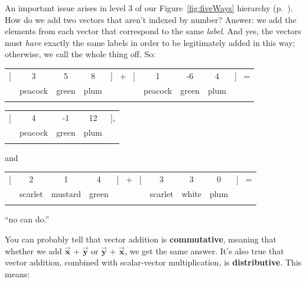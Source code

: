 An important issue arises in level 3 of our Figure~\ref{fig:fiveWays} hierarchy
(p.~\pageref{fig:fiveWays}). How do we add two vectors that aren't indexed by
number? Answer: we add the elements from each vector that correspond to the
same \textit{label}. And yes, the vectors must \textit{have} exactly the same
labels in order to be legitimately added in this way; otherwise, we call the
whole thing off. So:


\begin{center}
\begin{tabular}{ccccccccc}
[ & 3 & 5 & 8 & ] \ + \ [ & 1 & -6 & 4 & ] \ = \\
& \scriptsize{peacock} & \scriptsize{green} & \scriptsize{plum} & &
\scriptsize{peacock} & \scriptsize{green} & \scriptsize{plum} & \\
\normalsize
\end{tabular}
\vspace{-.15in}
\begin{tabular}{ccccc}
[ & 4 & -1 & 12 & ], \\
& \scriptsize{peacock} & \scriptsize{green} & \scriptsize{plum} & \\
\normalsize
\end{tabular}
\end{center}
\vspace{-.15in}

and


\begin{center}
\begin{tabular}{ccccccccc}
[ & 2 & 1 & 4 & ] \ + \ [ & 3 & 3 & 0 & ] \ = \\
& \scriptsize{scarlet} & \scriptsize{mustard} & \scriptsize{green} & &
\scriptsize{scarlet} & \scriptsize{white} & \scriptsize{plum} & \\
\normalsize
\end{tabular}

\vspace{-.15in}
``no can do.''
\end{center}
\vspace{-.15in}


\medskip
You can probably tell that vector addition is \textbf{commutative}, meaning
that whether we add $\overrightarrow{\textbf{x}}$ +
$\overrightarrow{\textbf{y}}$ or $\overrightarrow{\textbf{y}}$ +
$\overrightarrow{\textbf{x}}$, we get the same answer. It's also true that
vector addition, combined with scalar-vector multiplication, is
\textbf{distributive}. This means:

